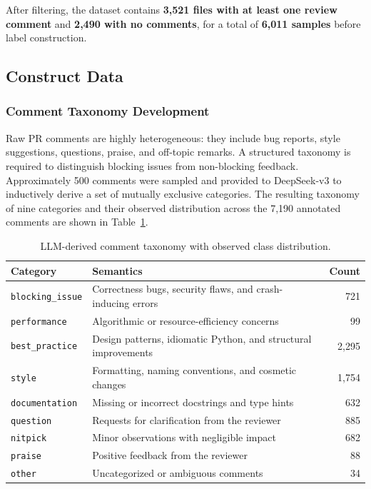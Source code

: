 \documentclass[11pt]{article}
\begin{document}
After filtering, the dataset contains \textbf{3,521 files with at least one review comment} and \textbf{2,490 with no comments}, for a total of \textbf{6,011 samples} before label construction.

\subsection*{Construct Data}

\subsubsection*{Comment Taxonomy Development}

Raw PR comments are highly heterogeneous: they include bug reports, style suggestions, questions, praise, and off-topic remarks. A structured taxonomy is required to distinguish blocking issues from non-blocking feedback. Approximately 500 comments were sampled and provided to DeepSeek-v3 to inductively derive a set of mutually exclusive categories. The resulting taxonomy of nine categories and their observed distribution across the 7,190 annotated comments are shown in Table~\ref{tab:taxonomy}.

\begin{table}[H]
\centering
\caption{LLM-derived comment taxonomy with observed class distribution.}
\label{tab:taxonomy}
\begin{tabular}{@{}lp{7.5cm}r@{}}
\toprule
\textbf{Category} & \textbf{Semantics} & \textbf{Count} \\ \midrule
\texttt{blocking\_issue} & Correctness bugs, security flaws, and crash-inducing errors & 721 \\ \midrule
\texttt{performance} & Algorithmic or resource-efficiency concerns & 99 \\ \midrule
\texttt{best\_practice} & Design patterns, idiomatic Python, and structural improvements & 2,295 \\ \midrule
\texttt{style} & Formatting, naming conventions, and cosmetic changes & 1,754 \\ \midrule
\texttt{documentation} & Missing or incorrect docstrings and type hints & 632 \\ \midrule
\texttt{question} & Requests for clarification from the reviewer & 885 \\ \midrule
\texttt{nitpick} & Minor observations with negligible impact & 682 \\ \midrule
\texttt{praise} & Positive feedback from the reviewer & 88 \\ \midrule
\texttt{other} & Uncategorized or ambiguous comments & 34 \\ \bottomrule
\end{tabular}
\end{table}
\end{document}
